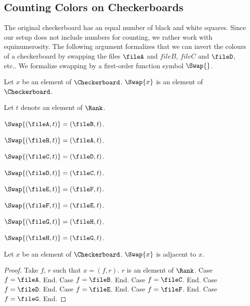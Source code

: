 \subsection{Counting Colors on Checkerboards}

The original checkerboard has an equal number of black and white squares.
Since our setup does not include numbers for counting, we rather work with
equinumerosity. The following argument formalizes that we can invert the
colours of a checkerboard by swapping the files $\fileA$ and $fileB$, $fileC$ and $\fileD$, etc..
We formalize swapping by a first-order function symbol $\Swap{}$.

\begin{forthel}
    \begin{signature}
        Let $x$ be an element of $\Checkerboard$.
        $\Swap{x}$ is an element of $\Checkerboard$.
    \end{signature}

    Let $t$ denote an element of $\Rank$.

    \begin{axiom} $\Swap{(\fileA, t)} = (\fileB, t)$. \end{axiom}
    \begin{axiom} $\Swap{(\fileB, t)} = (\fileA, t)$. \end{axiom}

    \begin{axiom} $\Swap{(\fileC, t)} = (\fileD, t)$. \end{axiom}
    \begin{axiom} $\Swap{(\fileD, t)} = (\fileC, t)$. \end{axiom}

    \begin{axiom} $\Swap{(\fileE, t)} = (\fileF, t)$. \end{axiom}
    \begin{axiom} $\Swap{(\fileF, t)} = (\fileE, t)$. \end{axiom}

    \begin{axiom} $\Swap{(\fileG, t)} = (\fileH, t)$. \end{axiom}
    \begin{axiom} $\Swap{(\fileH, t)} = (\fileG, t)$. \end{axiom}

    \begin{lemma}
        Let $x$ be an element of $\Checkerboard$.
        $\Swap{x}$ is adjacent to $x$.
    \end{lemma}
    \begin{proof}
        Take $f$, $r$ such that $x = (f, r)$.
        $r$ is an element of $\Rank$.
        Case $f = \fileA$. End.
        Case $f = \fileB$. End.
        Case $f = \fileC$. End.
        Case $f = \fileD$. End.
        Case $f = \fileE$. End.
        Case $f = \fileF$. End.
        Case $f = \fileG$. End.
    \end{proof}
\end{forthel}

